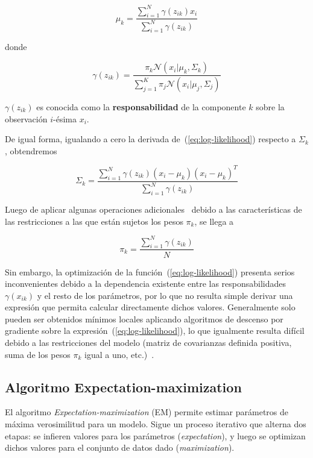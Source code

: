 \begin{equation}
    \label{eq:mu_k}
    \mu_k = \frac{\sum_{i=1}^{N}{\gamma(z_{ik})x_i}}{\sum_{i=1}^{N}{\gamma(z_{ik})}}
\end{equation}

\noindent
donde

\begin{equation}
    \label{eq:gamma}
    \gamma(z_{ik}) = \frac{\pi_k \mathcal{N}(x_i|\mu_k,\Sigma_k)}{\sum_{j=1}^{K}{\pi_j \mathcal{N}(x_i|\mu_j,\Sigma_j)}}
\end{equation}

$\gamma(z_{ik})$ es conocida como la \textbf{responsabilidad} de la componente $k$ sobre la observación $i$-ésima $x_i$.

De igual forma, igualando a cero la derivada de~(\ref{eq:log-likelihood}) respecto a $\Sigma_k$, obtendremos

\begin{equation}
    \label{eq:Sigma_k}
    \Sigma_k = \frac{\sum_{i=1}^{N}{\gamma(z_{ik})(x_i-\mu_k)(x_i-\mu_k)^T}}{\sum_{i=1}^{N}{\gamma(z_{ik})}}
\end{equation}

Luego de aplicar algunas operaciones adicionales~\cite{Aggarawal13} debido a las características de las restricciones a las que están sujetos los pesos $\pi_k$, se llega a

\begin{equation}
    \label{eq:pi_k}
    \pi_k = \frac{\sum_{i=1}^{N}{\gamma(z_{ik})}}{N}
\end{equation}

Sin embargo, la optimización de la función~(\ref{eq:log-likelihood}) presenta serios inconvenientes debido a la dependencia existente entre las responsabilidades $\gamma(x_{ik})$ y el resto de los parámetros, por lo que no resulta simple derivar una expresión que permita calcular directamente dichos valores.
Generalmente solo pueden ser obtenidos mínimos locales aplicando algoritmos de descenso por gradiente sobre la expresión~(\ref{eq:log-likelihood}), lo que igualmente resulta difícil debido a las restricciones del modelo (matriz de covarianzas definida positiva, suma de los pesos $\pi_k$ igual a uno, etc.)~\cite{Aggarawal13,Murphy12}.

\subsection{Algoritmo Expectation-maximization}\label{subsec:EM}

El algoritmo \textit{Expectation-maximization} (EM) permite estimar parámetros de máxima verosimilitud para un modelo.
Sigue un proceso iterativo que alterna dos etapas: se infieren valores para los parámetros (\textit{expectation}), y luego se optimizan dichos valores para el conjunto de datos dado (\textit{maximization}).


